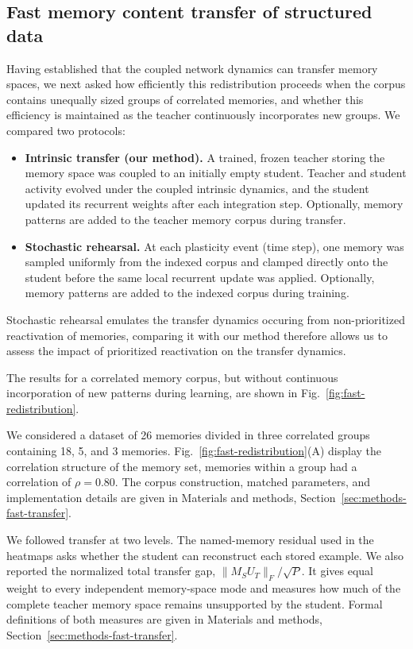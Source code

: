 \documentclass[10pt,letterpaper]{article}
\theoremstyle{plain}
\theoremstyle{remark}
\begin{document}
\newpage

\subsection{Fast memory content transfer of structured data}


Having established that the coupled network dynamics can transfer memory spaces, we next asked how efficiently this redistribution proceeds when the corpus contains unequally sized groups of correlated memories, and whether this efficiency is maintained as the teacher continuously incorporates new groups. We compared two protocols:
\begin{itemize}
    \item \textbf{Intrinsic transfer (our method).} A trained, frozen teacher storing the memory space was coupled to an initially empty student. Teacher and student activity evolved under the coupled intrinsic dynamics, and the student updated its recurrent weights after each integration step. Optionally, memory patterns are added to the teacher memory corpus during transfer.
    \item \textbf{Stochastic rehearsal.} At each plasticity event (time step), one memory was sampled uniformly from the indexed corpus and clamped directly onto the student before the same local recurrent update was applied. Optionally, memory patterns are added to the indexed corpus during training.
\end{itemize}

Stochastic rehearsal emulates the transfer dynamics occuring from non-prioritized reactivation of memories, comparing it with our method therefore allows us to assess the impact of prioritized reactivation on the transfer dynamics. 

The results for a correlated memory corpus, but without continuous incorporation of new patterns during learning, are shown in Fig.~\ref{fig:fast-redistribution}.

We considered a dataset of 26 memories divided in three correlated groups containing 18, 5, and 3 memories. Fig.~\ref{fig:fast-redistribution}(A) display the correlation structure of the memory set, memories within a group had a correlation of $\rho=0.80$.  The corpus construction, matched parameters, and implementation details are given in Materials and methods, Section~\ref{sec:methods-fast-transfer}.


We followed transfer at two levels. The named-memory residual used in the heatmaps asks whether the student can reconstruct each stored example. We also reported the normalized total transfer gap, $\lVert M_SU_T\rVert_F/\sqrt P$. It gives equal weight to every independent memory-space mode and measures how much of the complete teacher memory space remains unsupported by the student. Formal definitions of both measures are given in Materials and methods, Section~\ref{sec:methods-fast-transfer}.
\end{document}
